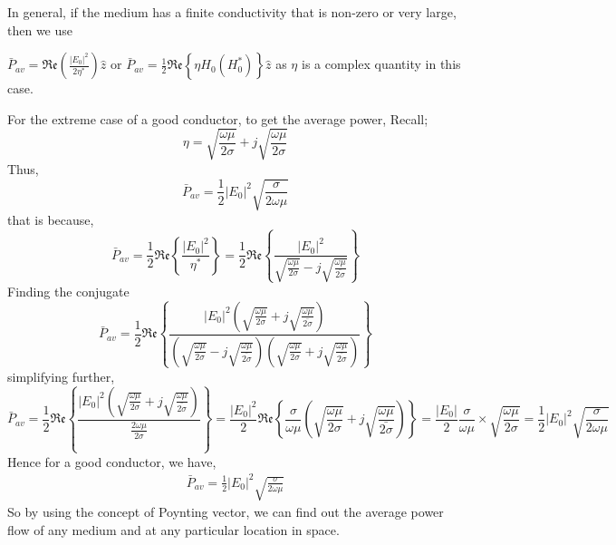 In general, if the medium has a finite conductivity that is non-zero or very large, then we use

$ \bar{P}_{av}=\mathfrak{Re}(\frac{|E_0|^{2}}{2\eta^{*}})\hat{z} $ or  $ \bar{P}_{av}= \frac{1}{2}\mathfrak{Re}\left\{\eta H_0(H_0^{*})\right\}\hat{z} $ 
as $ \eta $ is a complex quantity in this case.

For the extreme case of a good conductor, to get the average power, Recall;
\begin{dmath*}
\eta=\sqrt{\frac{\omega\mu}{2\sigma}}+j\sqrt{\frac{\omega\mu}{{2\sigma}}}
\end{dmath*}
Thus,
\begin{dmath*}
\bar{P}_{av}=\frac{1}{2}|E_0|^{2}\sqrt{\frac{\sigma}{2\omega\mu}} 
\end{dmath*}
that is because,
\begin{dmath*}
\bar{P}_{av}=\frac{1}{2}\mathfrak{Re}\left\{\frac{|E_0|^{2}}{\eta^{*}}\right\}=\frac{1}{2}\mathfrak{Re}\left\{\frac{|E_0|^{2}}{\sqrt{\frac{\omega\mu}{2\sigma}}-j\sqrt{\frac{\omega\mu}{\bar{2\sigma}}}}\right\}
\end{dmath*}
Finding the conjugate
\begin{dmath*}
\bar{P}_{av}= \frac{1}{2}\mathfrak{Re}\left\{\frac{|E_0|^{2}\left(\sqrt{\frac{\omega\mu}{2\sigma}}+j\sqrt{\frac{\omega\mu}{\bar{2\sigma}}}\right)}{\left(\sqrt{\frac{\omega\mu}{2\sigma}}-j\sqrt{\frac{\omega\mu}{\bar{2\sigma}}}\right)\left(\sqrt{\frac{\omega\mu}{2\sigma}}+j\sqrt{\frac{\omega\mu}{\bar{2\sigma}}}\right)}\right\}
\end{dmath*}
simplifying further,
\begin{dmath*}
\bar{P}_{av}=\frac{1}{2}\mathfrak{Re}\left\{\frac{|E_0|^{2}(\sqrt{\frac{\omega\mu}{2\sigma}}+j\sqrt{\frac{\omega\mu}{\bar{2\sigma}}})}{\frac{2\omega\mu}{2\sigma}}\right\}
= \frac{|E_0|^{2}}{2}\mathfrak{Re}\left\{\frac{\sigma}{\omega\mu}\left(\sqrt{\frac{\omega\mu}{2\sigma}}+j\sqrt{\frac{\omega\mu}{\bar{2\sigma}}}\right) \right\}
=\frac{|E_0|}{2}\frac{\sigma}{\omega\mu}\times\sqrt{\frac{\omega\mu}{2\sigma}}=\frac{1}{2}|E_0|^{2}\sqrt{\frac{\sigma}{2\omega\mu}} 
\end{dmath*}
Hence for a good conductor, we have, 
\begin{align}
\bar{P}_{av}=\frac{1}{2}|E_0|^{2}\sqrt{\frac{\sigma}{2\omega\mu}} 
\end{align}
So by using the concept of Poynting vector, we can find out the average power flow of any medium and at any particular location in space.


